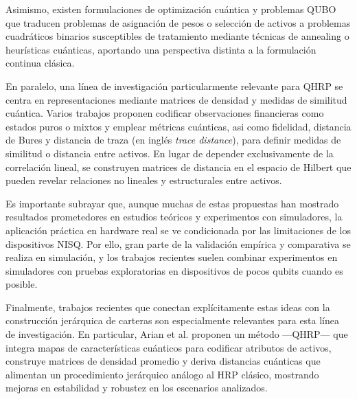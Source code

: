 Asimismo, existen formulaciones de optimización cuántica y problemas \gls{QUBO} que traducen problemas de asignación de pesos o selección de activos a problemas cuadráticos binarios susceptibles de tratamiento mediante técnicas de annealing o heurísticas cuánticas\cite{kadowaki1998quantumannealing}, aportando una perspectiva distinta a la formulación continua clásica.

En paralelo, una línea de investigación particularmente relevante para QHRP se centra en representaciones mediante matrices de densidad y medidas de similitud cuántica. Varios trabajos proponen\cite{markov2023quantumtimeseries} codificar observaciones financieras como estados puros o mixtos y emplear métricas cuánticas, asi como fidelidad, distancia de Bures y distancia de traza (en inglés \textit{trace distance}), para definir medidas de similitud o distancia entre activos. En lugar de depender exclusivamente de la correlación lineal, se construyen matrices de distancia en el espacio de Hilbert que pueden revelar relaciones no lineales y estructurales entre activos.

Es importante subrayar que, aunque muchas de estas propuestas han mostrado resultados prometedores en estudios teóricos y experimentos con simuladores, la aplicación práctica en hardware real se ve condicionada por las limitaciones de los dispositivos \gls{NISQ}. Por ello, gran parte de la validación empírica y comparativa se realiza en simulación, y los trabajos recientes suelen combinar experimentos en simuladores con pruebas exploratorias en dispositivos de pocos qubits cuando es posible\cite{naik2023quantumfinance}.

Finalmente, trabajos recientes que conectan explícitamente estas ideas con la construcción jerárquica de carteras son especialmente relevantes para esta línea de investigación. En particular, Arian et al.\cite{arian2025qhrp} proponen un método —\gls{QHRP}— que integra mapas de características cuánticos para codificar atributos de activos, construye matrices de densidad promedio y deriva distancias cuánticas que alimentan un procedimiento jerárquico análogo al \gls{HRP} clásico, mostrando mejoras en estabilidad y robustez en los escenarios analizados.

